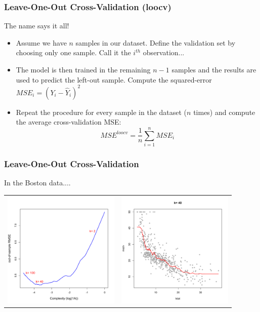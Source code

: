 \documentclass[flegn]{beamer}
\begin{document}
\begin{frame}
\frametitle{Leave-One-Out Cross-Validation (loocv)}

The name says it all! 
\begin{itemize}
\item Assume we have $n$ samples in our dataset. Define the validation set by choosing only {\color{red}one sample}. Call it the $i^{th}$ observation...
\item The model is then trained in the remaining $n-1$ samples and the results are used to predict the left-out sample. Compute the squared-error $MSE_i = (Y_i - \hat{Y}_i)^2$
\item {\color{red}Repeat the procedure for every sample in the dataset ($n$ times) and compute the average cross-validation MSE:
$$
MSE^{loocv} = \frac{1}{n}\sum_{i=1}^n MSE_i
$$}
\end{itemize}
\end{frame}



\begin{frame}
\frametitle{Leave-One-Out Cross-Validation}
In the Boston data.... 
\vspace{-1cm}
\begin{center}
\begin{tabular}{cc}
\includegraphics[width=2.2in]{Boston_LOOCV}&\includegraphics[width=2.2in]{Bostonk40}\\
\end{tabular}
\end{center}

\end{frame}
\end{document}
